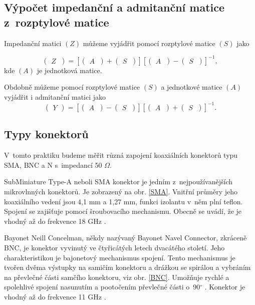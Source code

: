 \documentclass{protokol}
\begin{document}
\subsection{Výpočet impedanční a admitanční matice z~rozptylové matice}

Impedanční matici $(Z)$ můžeme vyjádřit pomocí rozptylové matice $(S)$ jako

\[
\begin{pmatrix}
	Z~\end{pmatrix}
=
[\begin{pmatrix}
	A~\end{pmatrix}
+
\begin{pmatrix}
	S~\end{pmatrix}]
%
[\begin{pmatrix}
	A~\end{pmatrix}
-
\begin{pmatrix}
	S~\end{pmatrix}]^{-1}
,\]
kde $(A)$ je jednotková matice.
\bigskip

Obdobně můžeme pomocí rozptylové matice $(S)$ a jednotkové matice $(A)$ vyjádřit i admitanční matici jako
\[
\begin{pmatrix}
	Y
\end{pmatrix}
=
[\begin{pmatrix}
	A~\end{pmatrix}
-
\begin{pmatrix}
	S~\end{pmatrix}]
%
[\begin{pmatrix}
	A~\end{pmatrix}
+
\begin{pmatrix}
	S~\end{pmatrix}]^{-1}
.\]

\subsection{Typy konektorů}
V~tomto praktiku budeme měřit různá zapojení koaxiálních konektorů typu SMA, BNC a N s~impedancí 50 $\Omega$.

SubMiniature Type-A neboli SMA konektor je jedním z~nejpoužívanějších mikrovlnných konektorů. Je zobrazený na obr. \ref{SMA}. Vnitřní průměry jeho koaxiálního vedení jsou 4,1 mm a 1,27 mm, funkci izolantu v~něm plní teflon. Spojení se zajišťuje pomocí šroubovacího mechanismu. Obecně se uvádí, že je vhodný až do frekvence 18 GHz \cite{rfhandbook}. 

Bayonet Neill Concelman, někdy nazývaný Bayonet Navel Connector, zkráceně BNC, je konektor vyvinutý ve čtyřicátých letech dvacátého století. Jeho charakteristikou je bajonetový mechanismus spojení. Tento mechanismus je tvořen dvěma výstupky na samičím konektoru a drážkou se spirálou a vybráním na převlečné části samčího konektoru, viz obr. \ref{BNC}. Umožňuje rychlé a spolehlivé spojení nasunutím a pootočením převlečné části o~90$^{\circ}$ \cite{czwiki}. Konektor je vhodný až do frekvence 11 GHz \cite{rfhandbook}.
\end{document}
